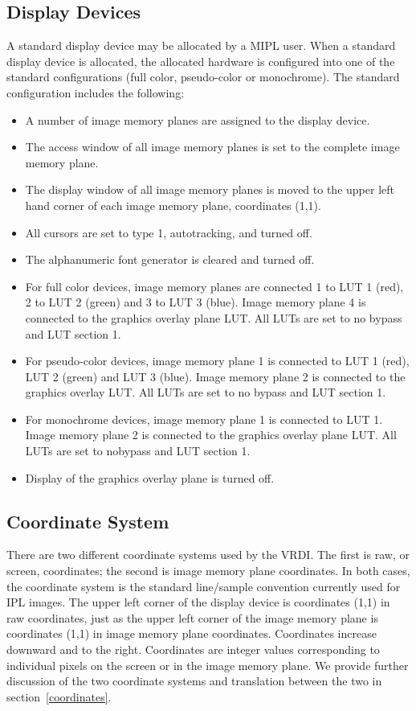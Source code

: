 \subsection{Display Devices}
A standard display device may be allocated by a MIPL user.
When a standard display device is allocated, the allocated
hardware is configured into one of the standard configurations (full
color, pseudo-color or monochrome).  The standard configuration
includes the following:
\begin{itemize}
\item A number of image memory planes are assigned to the display device.
\item The access window of all image memory planes is set to the complete
image memory plane.
\item The display window of all image memory planes is moved to
the upper left hand corner of each image memory plane, coordinates (1,1).
\item All cursors are set to type 1, autotracking, and turned off.
\item The alphanumeric font generator is cleared and turned off.
\item For full color devices, image memory planes are connected 1 to LUT 1
(red), 2 to LUT 2 (green) and 3 to LUT 3 (blue).  Image memory plane
4 is connected to the graphics overlay plane LUT.  All LUTs are set
to no bypass and LUT section 1.
\item For pseudo-color devices, image memory plane 1 is connected to LUT 1
(red), LUT 2 (green) and LUT 3 (blue).  Image memory plane 2 is
connected to the graphics overlay LUT.  All LUTs are set to no bypass
and LUT section 1.
\item For monochrome devices, image memory plane 1 is connected to LUT 1.
Image memory plane 2 is
connected to the graphics overlay plane LUT.  All LUTs are set to
nobypass and LUT section 1.
\item Display of the graphics overlay plane is turned off.
\end{itemize}
\subsection{Coordinate System}
There are two different coordinate systems used by the VRDI.  The
first is raw, or screen, coordinates; the second is image memory
plane coordinates.  In both cases, the coordinate system is the
standard line/sample convention currently used for IPL images.  The
upper left corner of the display device is coordinates (1,1) in
raw coordinates, just as the upper left corner of the image memory
plane is coordinates (1,1) in image memory plane coordinates.
Coordinates increase downward and to the right.  Coordinates are
integer values corresponding to individual pixels on the screen or
in the image memory plane.  We provide further discussion of the
two coordinate systems and translation between the two in
section~\ref{coordinates}.
